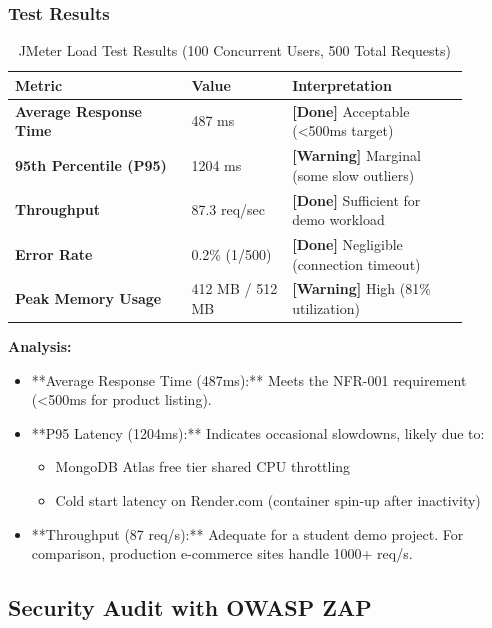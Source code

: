 \documentclass[12pt, a4paper]{report}
\begin{document}
\subsubsection{Test Results}

\begin{table}[H]
\centering
\caption{JMeter Load Test Results (100 Concurrent Users, 500 Total Requests)}
\label{tab:jmeter_results}
\begin{tabular}{@{}p{0.35\linewidth}p{0.20\linewidth}p{0.35\linewidth}@{}}
\toprule
\textbf{Metric} & \textbf{Value} & \textbf{Interpretation} \\
\midrule
\textbf{Average Response Time} & 487 ms & \textbf{[Done]} Acceptable (\textless 500ms target) \\
\textbf{95th Percentile (P95)} & 1204 ms & \textbf{[Warning]} Marginal (some slow outliers) \\
\textbf{Throughput} & 87.3 req/sec & \textbf{[Done]} Sufficient for demo workload \\
\textbf{Error Rate} & 0.2\% (1/500) & \textbf{[Done]} Negligible (connection timeout) \\
\textbf{Peak Memory Usage} & 412 MB / 512 MB & \textbf{[Warning]} High (81\% utilization) \\
\bottomrule
\end{tabular}
\end{table}

\textbf{Analysis:}
\begin{itemize}
    \item **Average Response Time (487ms):** Meets the NFR-001 requirement (\textless 500ms for product listing).
    \item **P95 Latency (1204ms):** Indicates occasional slowdowns, likely due to:
    \begin{itemize}
        \item MongoDB Atlas free tier shared CPU throttling
        \item Cold start latency on Render.com (container spin-up after inactivity)
    \end{itemize}
    \item **Throughput (87 req/s):** Adequate for a student demo project. For comparison, production e-commerce sites handle 1000+ req/s.
\end{itemize}

\subsection{Security Audit with OWASP ZAP}
\end{document}
